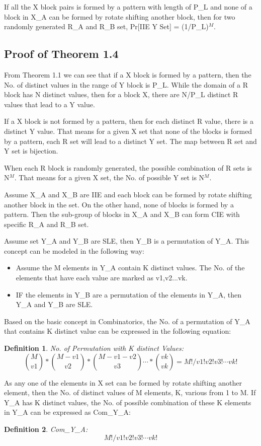 \documentclass{article}
\newtheorem{defination}{Definition}[section]
\begin{document}
If all the X block pairs is formed by a pattern with length of P\_L and none of a block in X\_A can be formed by rotate shifting another block, then for two randomly generated R\_A and R\_B set, Pr[IIE Y Set] = (1/P\_L)$^M$.

\subsection{Proof of Theorem 1.4}
From Theorem 1.1 we can see that if a X block is formed by a pattern, then the No. of distinct values in the range of Y block is P\_L. While the domain of a R block has N distinct values, then for a block X, there are N/P\_L distinct R values that lead to a Y value.

If a X block is not formed by a pattern, then for each distinct R value, there is a distinct Y value. That means for a given X set that none of the blocks is formed by a pattern, each R set will lead to a distinct Y set. The map between R set and Y set is bijection.

When each R block is randomly generated, the possible combination of R sets is N$^M$. That means for a given X set, the No. of possible Y set is N$^M$.

Assume X\_A and X\_B are IIE and each block can be formed by rotate shifting another block in the set. On the other hand, none of blocks is formed by a pattern. Then the sub-group of blocks in X\_A and X\_B can form CIE with specific R\_A and R\_B set. 

Assume set Y\_A and Y\_B are SLE, then Y\_B is a permutation of Y\_A. This concept can be modeled in the following way:
\begin{itemize}
	\item Assume the M elements in Y\_A contain K distinct values. The No. of the elements that have each value are marked as v1,v2...vk.
	\item IF the elements in Y\_B are a permutation of the elements in Y\_A, then Y\_A and Y\_B are SLE.
\end{itemize}

Based on the basic concept in Combinatorics, the No. of a permutation of Y\_A that contains K distinct value can be expressed in the following equation:
\begin{defination}
No. of Permutation with K distinct Values:
\begin{displaymath}
\binom{M}{v1} * \binom{M-v1}{v2} * \binom{M-v1-v2}{v3} \cdots * \binom{vk}{vk} = M!/v1!v2!v3! \cdots vk!
\end{displaymath}
\end{defination}
As any one of the elements in X set can be formed by rotate shifting another element, then the No. of distinct values of M elements, K, various from 1 to M. If Y\_A has K distinct values, the No. of possible combination of these K elements in Y\_A can be expressed as Com\_Y\_A:
\begin{defination}
Com\_Y\_A:
\begin{displaymath}
M!/v1!v2!v3! \cdots vk!
\end{displaymath} 
\end{defination} 
\end{document}
